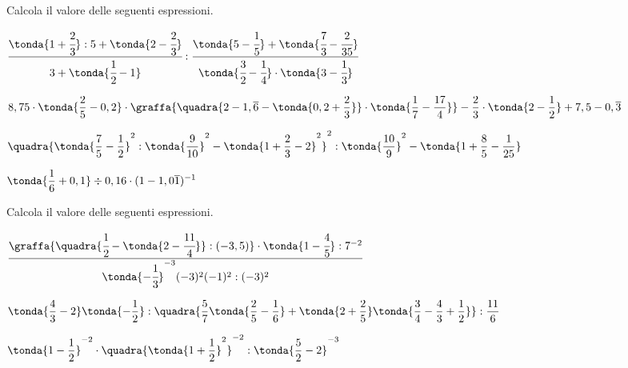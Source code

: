 \begin{esercizio}[*]
\label{ese:3.152}
 Calcola il valore delle seguenti espressioni.
\begin{enumeratees}
\spazielenx
\item \(\displaystyle{\cfrac{\tonda{1+\cfrac{2}{3}}:5+\tonda{2-
\cfrac{2}{3}}}{3+\tonda{\cfrac{1}{2}-1}}:
\frac{\tonda{5-\cfrac{1}{5}}+\tonda{\cfrac{7}{3}-\cfrac{2}{35}}}
{\tonda{\cfrac{3}{2}-\cfrac{1}{4}}\cdot
\tonda{3-\cfrac{1}{3}}}}\)
\item \(\displaystyle{8,75\cdot\tonda{\frac{2}{5}-0,2}\cdot
\graffa{\quadra{2-1,\overline{6}-\tonda{0,2+\frac{2}{3}}}
\cdot\tonda{\frac{1}{7}-\frac{17}{4}}}-\frac{2}{3}\cdot
\tonda{2-\frac{1}{2}}+7,5-0,\overline{3}}\)
\item \(\displaystyle{\quadra{\tonda{\frac{7}{5}-\frac{1}{2}}^{2}:
\tonda{\frac{9}{10}}^{2}-
\tonda{1+\frac{2}{3}-2}^{2}}^{2}:\tonda{\frac{10}{9}}^{2}-
\tonda{1+\frac{8}{5}-\frac{1}{25}}}\)
\item \(\displaystyle{\tonda{\frac{1}{6}+0,1}\div 0,16\cdot
(1-1,0\overline{1})^{-1}}\)
\end{enumeratees}
\end{esercizio}

\begin{esercizio}[*]
\label{ese:3.153}
 Calcola il valore delle seguenti espressioni.
\begin{enumeratees}
\spazielenx
\item \(\displaystyle{\frac{\graffa{\quadra{\cfrac{1}{2}-\tonda{2-
\cfrac{11}{4}}}:(-3,5)}\cdot
\tonda{1-\cfrac{4}{5}}:7^{-2}}{\tonda{-{\cfrac{1}{3}}
}^{-3}(-3)^{2}(-1)^{2}:(-3)^{2}}}\)
\item \(\displaystyle{\tonda{\frac{4}{3}-2}\tonda{-{\frac{1}{2}}}:
\quadra{\frac{5}{7}\tonda{\frac{2}{5}-\frac{1}{6}}
+\tonda{2+\frac{2}{5}}\tonda{\frac{3}{4}-\frac{4}{3}+
\frac{1}{2}}}:\frac{11}{6}}\)
\item \(\displaystyle{\tonda{1-\frac{1}{2}}^{-2}\cdot
\quadra{\tonda{1+\frac{1}{2}}^{2}}^{-2}:\tonda{\frac{5}{2}-2
}^{-3}}\)
\end{enumeratees}
\end{esercizio}

%  

